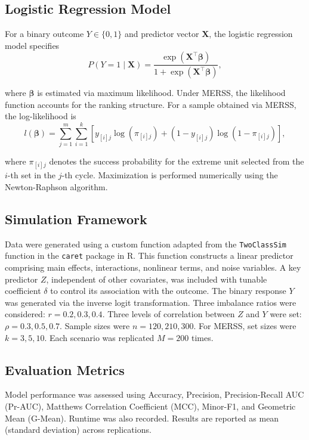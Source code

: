 \documentclass[twoside]{article}
\begin{document}
\subsection{Logistic Regression Model}

For a binary outcome \(Y \in \{0,1\}\) and predictor vector \(\mathbf{X}\), the logistic regression model specifies
\[
P(Y = 1 \mid \mathbf{X}) = \frac{\exp(\mathbf{X}^{\top}\boldsymbol{\beta})}{1 + \exp(\mathbf{X}^{\top}\boldsymbol{\beta})},
\]

where \(\boldsymbol{\beta}\) is estimated via maximum likelihood. Under MERSS, the likelihood function accounts for the ranking structure. For a sample obtained via MERSS, the log-likelihood is
\[
l(\boldsymbol{\beta}) = \sum_{j=1}^{m} \sum_{i=1}^{k} \left[ y_{[i]j} \log(\pi_{[i]j}) + (1 - y_{[i]j}) \log(1 - \pi_{[i]j}) \right],
\]

where \(\pi_{[i]j}\) denotes the success probability for the extreme unit selected from the \(i\)-th set in the \(j\)-th cycle. Maximization is performed numerically using the Newton-Raphson algorithm. 

\subsection{Simulation Framework}

Data were generated using a custom function adapted from the \texttt{TwoClassSim} function in the \texttt{caret} package in R. This function constructs a linear predictor comprising main effects, interactions, nonlinear terms, and noise variables. A key predictor \(Z\), independent of other covariates, was included with tunable coefficient \(\delta\) to control its association with the outcome. The binary response \(Y\) was generated via the inverse logit transformation. Three imbalance ratios were considered: \(r = 0.2, 0.3, 0.4\). Three levels of correlation between \(Z\) and \(Y\) were set: \(\rho = 0.3, 0.5, 0.7\). Sample sizes were \(n = 120, 210, 300\). For MERSS, set sizes were \(k = 3, 5, 10\). Each scenario was replicated \(M = 200\) times.

\subsection{Evaluation Metrics}

Model performance was assessed using Accuracy, Precision, Precision-Recall AUC (Pr-AUC), Matthews Correlation Coefficient (MCC), Minor-F1, and Geometric Mean (G-Mean). Runtime was also recorded. Results are reported as mean (standard deviation) across replications.
\end{document}
